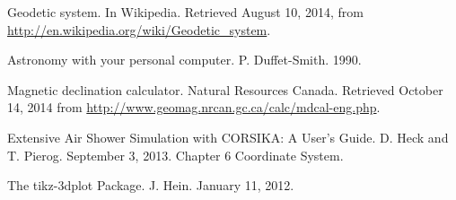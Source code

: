 

\begin{thebibliography}{9}

Geodetic system. In Wikipedia. Retrieved August 10, 2014,
from \url{http://en.wikipedia.org/wiki/Geodetic_system}.

Astronomy with your personal computer. P. Duffet-Smith.
1990.

Magnetic declination calculator. Natural Resources Canada.
Retrieved October 14, 2014 from
\url{http://www.geomag.nrcan.gc.ca/calc/mdcal-eng.php}.

Extensive Air Shower Simulation with CORSIKA: A User’s Guide. D. Heck
and T. Pierog. September 3, 2013. Chapter 6 Coordinate System.

The tikz-3dplot Package. J. Hein. January 11, 2012.

\end{thebibliography}
